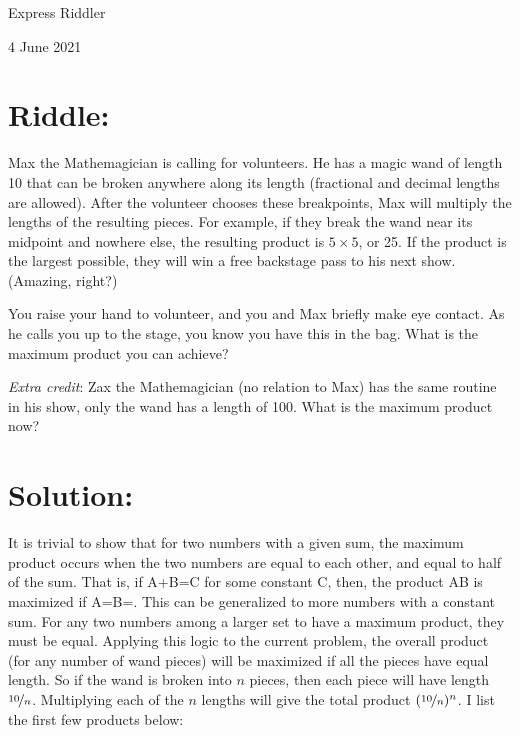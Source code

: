 \documentclass{article}
\begin{document}
\pagestyle{empty} %

\begin{center}
{\LARGE Express Riddler}

\vspace{0.15in}

{\Large 4 June 2021}
\end{center}


\section*{Riddle:}

Max the Mathemagician is calling for volunteers.
He has a magic wand of length 10 that can be broken anywhere along its length (fractional and decimal lengths are allowed).
After the volunteer chooses these breakpoints, Max will multiply the lengths of the resulting pieces.
For example, if they break the wand near its midpoint and nowhere else, the resulting product is $5\times5$, or 25.
If the product is the largest possible, they will win a free backstage pass to his next show.
(Amazing, right?)

You raise your hand to volunteer, and you and Max briefly make eye contact.
As he calls you up to the stage, you know you have this in the bag.
What is the maximum product you can achieve?

\textit{Extra credit}: Zax the Mathemagician (no relation to Max) has the same routine in his show, only the wand has a length of 100.
What is the maximum product now?


\section*{Solution:}

It is trivial to show that for two numbers with a given sum, the maximum product occurs when the two numbers are equal to each other, and equal to half of the sum.
That is, if A+B=C for some constant C, then, the product AB is maximized if A=B=.
This can be generalized to more numbers with a constant sum.
For any two numbers among a larger set to have a maximum product, they must be equal.
Applying this logic to the current problem, the overall product (for any number of wand pieces) will be maximized if all the pieces have equal length.
So if the wand is broken into $n$ pieces, then each piece will have length $\nicefrac{10}{n}$.
Multiplying each of the $n$ lengths will give the total product $(\nicefrac{10}{n})^{n}$.
I list the first few products below:
\end{document}
